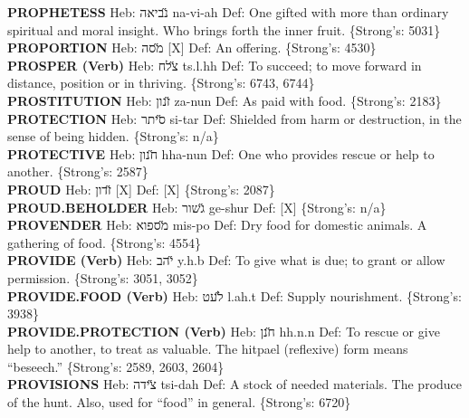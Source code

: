 {\textbf{PROPHETESS} Heb: {\large\H נביאה} na-vi-ah Def: One gifted with more than ordinary spiritual and moral insight. Who brings forth the inner fruit. \{Strong's: 5031\}\hfill{}\\

\textbf{PROPORTION} Heb: {\large\H מסה} {[}X{]} Def: An offering. \{Strong's: 4530\}\hfill{}\\

\textbf{PROSPER (Verb)} Heb: {\large\H צלח} ts.l.hh Def: To succeed; to move forward in distance, position or in thriving. \{Strong's: 6743, 6744\}\hfill{}\\

\textbf{PROSTITUTION} Heb: {\large\H זנון} za-nun Def: As paid with food. \{Strong's: 2183\}\hfill{}\\

\textbf{PROTECTION} Heb: {\large\H סיתר} si-tar Def: Shielded from harm or destruction, in the sense of being hidden. \{Strong's: n/a\}\hfill{}\\

\textbf{PROTECTIVE} Heb: {\large\H חנון} hha-nun Def: One who provides rescue or help to another. \{Strong's: 2587\}\hfill{}\\

\textbf{PROUD} Heb: {\large\H זדון} {[}X{]} Def: {[}X{]} \{Strong's: 2087\}\hfill{}\\

\textbf{PROUD.BEHOLDER} Heb: {\large\H גשור} ge-shur Def: {[}X{]} \{Strong's: n/a\}\hfill{}\\

\textbf{PROVENDER} Heb: {\large\H מספוא} mis-po Def: Dry food for domestic animals. A gathering of food. \{Strong's: 4554\}\hfill{}\\

\textbf{PROVIDE (Verb)} Heb: {\large\H יהב} y.h.b Def: To give what is due; to grant or allow permission. \{Strong's: 3051, 3052\}\hfill{}\\

\textbf{PROVIDE.FOOD (Verb)} Heb: {\large\H לעט} l.ah.t Def: Supply nourishment. \{Strong's: 3938\}\hfill{}\\

\textbf{PROVIDE.PROTECTION (Verb)} Heb: {\large\H חנן} hh.n.n Def: To rescue or give help to another, to treat as valuable. The hitpael (reflexive) form means ``beseech.'' \{Strong's: 2589, 2603, 2604\}\hfill{}\\

\textbf{PROVISIONS} Heb: {\large\H צידה} tsi-dah Def: A stock of needed materials. The produce of the hunt. Also, used for ``food'' in general. \{Strong's: 6720\}\hfill{}\\

}
